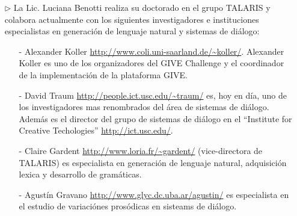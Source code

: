 \begin{itemize}
\item[$\triangleright$] La Lic. Luciana Benotti realiza su doctorado en el
grupo TALARIS y colabora actualmente con los siguientes investigadores e instituciones
especialistas en generaci\'on de lenguaje natural y sistemas de di\'alogo:
\begin{itemize}
    \item[-]  Alexander Koller \url{http://www.coli.uni-saarland.de/~koller/}.
Alexander Koller es uno de los organizadores del GIVE Challenge y el
coordinador de la implementaci\'on de la plataforma GIVE.
    \item[-] David Traum \url{http://people.ict.usc.edu/~traum/} es, hoy en d\'ia, uno
de los investigadores mas renombrados del \'area de sistemas de di\'alogo.
Adem\'as es el director del grupo de sistemas de di\'alogo en el ``Institute
for Creative Techologies'' \url{http://ict.usc.edu/}.
\item[-] Claire Gardent \url{http://www.loria.fr/~gardent/} (vice-directora de
TALARIS) es especialista en generaci\'on de lenguaje natural, adquisici\'on
lexica y desarrollo de gram\'aticas.
\item[-] Agust\'in Gravano \url{http://www.glyc.dc.uba.ar/agustin/} es especialista
en el estudio de variaci\'ones pros\'odicas en sisteams de di\'alogo.

\end{itemize}
\end{itemize}




